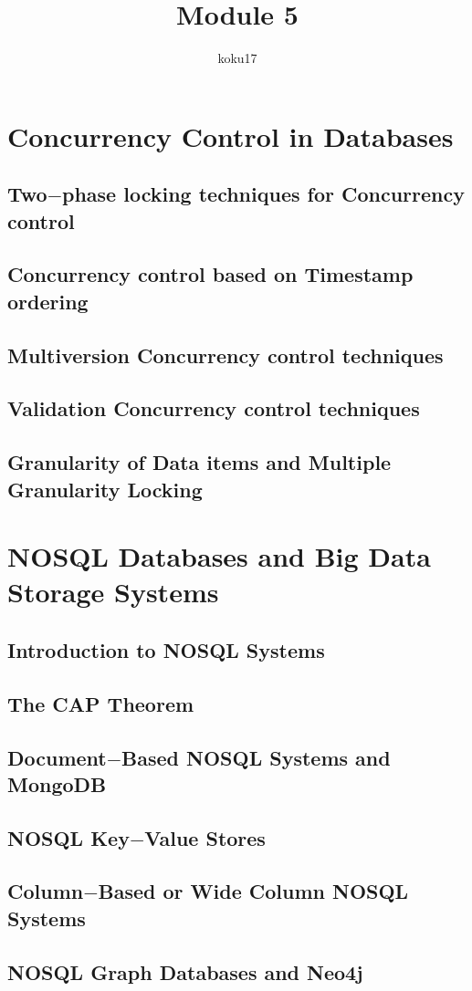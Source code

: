 \documentclass{article}
\title{Module 5}
\author{koku17}
\begin{document}
	\maketitle \thispagestyle{empty} \newpage
	\tableofcontents \thispagestyle{empty} \newpage
	\section{Concurrency Control in Databases}
	\subsection{Two$-$phase locking techniques for Concurrency control}
	\subsection{Concurrency control based on Timestamp ordering}
	\subsection{Multiversion Concurrency control techniques}
	\subsection{Validation Concurrency control techniques}
	\subsection{Granularity of Data items and Multiple Granularity Locking}

	\section{NOSQL Databases and Big Data Storage Systems}
	\subsection{Introduction to NOSQL Systems}
	\subsection{The CAP Theorem}
	\subsection{Document$-$Based NOSQL Systems and MongoDB}
	\subsection{NOSQL Key$-$Value Stores}
	\subsection{Column$-$Based or Wide Column NOSQL Systems}
	\subsection{NOSQL Graph Databases and Neo4j}
\end{document}
